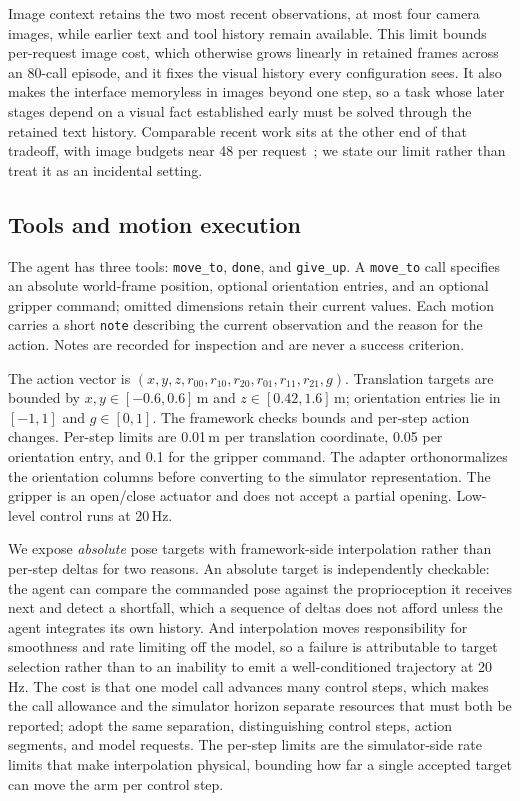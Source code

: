 \documentclass[11pt]{article}
\begin{document}
Image context retains the two most recent observations, at most four camera
images, while earlier text and tool history remain available. This limit bounds
per-request image cost, which otherwise grows linearly in retained frames
across an 80-call episode, and it fixes the visual history every configuration
sees. It also makes the interface memoryless in images beyond one step, so a
task whose later stages depend on a visual fact established early must be
solved through the retained text history. Comparable recent work sits at the
other end of that tradeoff, with image budgets near 48 per
request~\citep{roboicl2026,vlmagents2026}; we state our limit rather than treat
it as an incidental setting.

\subsection{Tools and motion execution}
The agent has three tools: \texttt{move\_to}, \texttt{done}, and
\texttt{give\_up}. A \texttt{move\_to} call specifies an absolute world-frame
position, optional orientation entries, and an optional gripper command;
omitted dimensions retain their current values. Each motion carries a short
\texttt{note} describing the current observation and the reason for the action.
Notes are recorded for inspection and are never a success criterion.

The action vector is $(x,y,z,r_{00},r_{10},r_{20},r_{01},r_{11},r_{21},g)$.
Translation targets are bounded by $x,y\in[-0.6,0.6]$\,m and
$z\in[0.42,1.6]$\,m; orientation entries lie in $[-1,1]$ and $g\in[0,1]$. The
framework checks bounds and per-step action changes. Per-step limits are
0.01\,m per translation coordinate, 0.05 per orientation entry, and 0.1 for the
gripper command. The adapter orthonormalizes the orientation columns before
converting to the simulator representation. The gripper is an open/close
actuator and does not accept a partial opening. Low-level control runs at
20\,Hz.

We expose \emph{absolute} pose targets with framework-side interpolation rather
than per-step deltas for two reasons. An absolute target is independently
checkable: the agent can compare the commanded pose against the proprioception
it receives next and detect a shortfall, which a sequence of deltas does not
afford unless the agent integrates its own history. And interpolation moves
responsibility for smoothness and rate limiting off the model, so a failure is
attributable to target selection rather than to an inability to emit a
well-conditioned trajectory at 20\,Hz. The cost is that one model call advances
many control steps, which makes the call allowance and the simulator horizon
separate resources that must both be reported; \citet{galbot2026astra} adopt
the same separation, distinguishing control steps, action segments, and model
requests. The per-step limits are the simulator-side rate limits that make
interpolation physical, bounding how far a single accepted target can move the
arm per control step.
\end{document}

